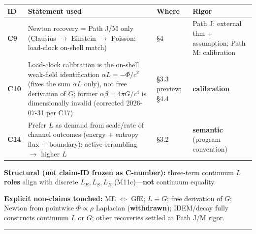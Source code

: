 \documentclass[
  11pt,
]{article}
\newcounter{none} %
\begin{document}
{\def\LTcaptype{none} %
\begin{longtable}[]{@{}
  >{\raggedright\arraybackslash}p{}
  >{\raggedright\arraybackslash}p{}
  >{\raggedright\arraybackslash}p{}
  >{\raggedright\arraybackslash}p{}@{}}
\toprule\noalign{}
\begin{minipage}[b]{\linewidth}\raggedright
ID
\end{minipage} & \begin{minipage}[b]{\linewidth}\raggedright
Statement used
\end{minipage} & \begin{minipage}[b]{\linewidth}\raggedright
Where
\end{minipage} & \begin{minipage}[b]{\linewidth}\raggedright
Rigor
\end{minipage} \\
\midrule\noalign{}
\endhead
\bottomrule\noalign{}
\endlastfoot
\textbf{C9} & Newton recovery = Path J/M only (Clausius $\to$ Einstein $\to$
Poisson; load-clock on-shell match) & §4 & Path J: external thm +
assumption; Path M: calibration \\
\textbf{C10} & Load-clock calibration is the on-shell weak-field
identification \(\alpha L=-\Phi/c^2\) (fixes the sum \(\alpha L\) only), not free
derivation of \(G\); former \(\alpha\beta=4\pi G/c^4\) is dimensionally invalid
(corrected 2026-07-31 per C17) & §3.3 preview; §4.4 & \textbf{calibration} \\
\textbf{C14} & Prefer \(L\) as demand from scale/rate of channel
outcomes (energy + entropy flux + boundary); active scrambling $\to$ higher
\(L\) & §3.2 & \textbf{semantic} (program convention) \\
\end{longtable}
}

\textbf{Structural (not claim-ID frozen as C-number):} three-term
continuum \(L\) \textbf{roles} align with discrete \(L_E,L_S,L_B\)
(M11c)---\textbf{not} continuum equality.

\textbf{Explicit non-claims touched:} ME \(\Leftrightarrow\) GfE;
\(L\equiv G\); free derivation of \(G\); Newton from pointwise
\(\Phi\propto\rho\) Laplacian (\textbf{withdrawn}); IDEM/decay fully
constructs continuum \(L\) or \(G\); other recoveries settled at Path
J/M rigor.

\begin{center}\rule{0.5\linewidth}{0.5pt}\end{center}
\end{document}
